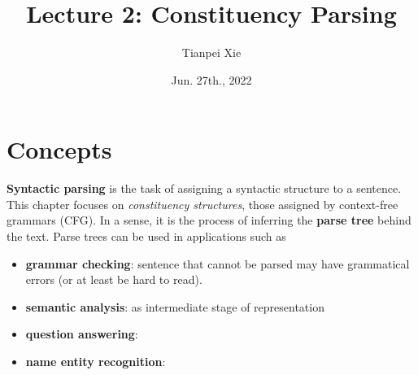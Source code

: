 \documentclass[11pt]{article}
\begin{document}
\title{Lecture 2: Constituency Parsing}
\author{ Tianpei Xie}
\date{ Jun. 27th., 2022 }
\maketitle
\tableofcontents
\newpage
\allowdisplaybreaks
\section{Concepts}
\textbf{Syntactic parsing} is the task of assigning a syntactic structure to a sentence. This chapter focuses on \emph{constituency structures}, those assigned by context-free grammars (CFG). In a sense, it is the process of inferring the \textbf{parse tree} behind the text. Parse trees can be used in applications such as
\begin{itemize}
\item  \textbf{grammar checking}: sentence that cannot be parsed may have grammatical errors (or at least be hard to read). 
\item \textbf{semantic analysis}: as intermediate stage of representation
\item \textbf{question answering}: 
\item \textbf{name entity recognition}:
\end{itemize}
\end{document}
